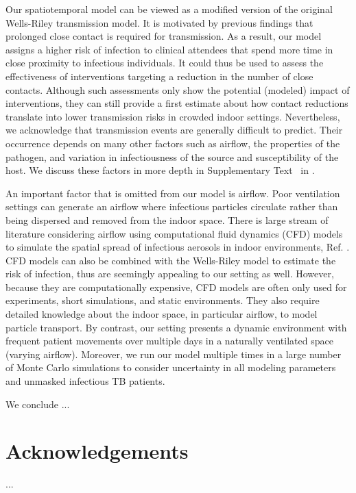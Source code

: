 \documentclass[fleqn,11pt]{wlscirep}
\begin{document}
Our spatiotemporal model can be viewed as a modified version of the original Wells-Riley transmission model\cite{Riley1978AJE}. It is motivated by previous findings that prolonged close contact is required for transmission\cite{Leung2020NatMed,Brankston2007LancetID,Narasimhan2013PulmonaryMed}. As a result, our model assigns a higher risk of infection to clinical attendees that spend more time in close proximity to infectious individuals. It could thus be used to assess the effectiveness of interventions targeting a reduction in the number of close contacts. Although such assessments only show the potential (modeled) impact of interventions, they can still provide a first estimate about how contact reductions translate into lower transmission risks in crowded indoor settings. Nevertheless, we acknowledge that transmission events are generally difficult to predict. Their occurrence depends on many other factors such as airflow, the properties of the pathogen, and variation in infectiousness of the source and susceptibility of the host\cite{Wang2021Science}. We discuss these factors in more depth in Supplementary Text~ in \supp.

An important factor that is omitted from our model is airflow. Poor ventilation settings can generate an airflow where infectious particles circulate rather than being dispersed and removed from the indoor space\cite{Li2021BuildEnv}. There is large stream of literature considering airflow using computational fluid dynamics (CFD) models to simulate the spatial spread of infectious aerosols in indoor environments, \eg Ref. \cite{Vuorinen2020SafSci,Jung2021InfectChemo,Li2021BuildEnv}. CFD models can also be combined with the Wells-Riley model to estimate the risk of infection\cite{Yan2023BE,Qian2009BE,Li2022SOTTE}, thus are seemingly appealing to our setting as well. However, because they are computationally expensive, CFD models are often only used for experiments, short simulations, and static environments. They also require detailed knowledge about the indoor space, in particular airflow, to model particle transport. By contrast, our setting presents a dynamic environment with frequent patient movements over multiple days in a naturally ventilated space (varying airflow). Moreover, we run our model multiple times in a large number of Monte Carlo simulations to consider uncertainty in all modeling parameters and unmasked infectious TB patients. 



We conclude ...


\newpage


\section*{Acknowledgements}
...


\end{document}
